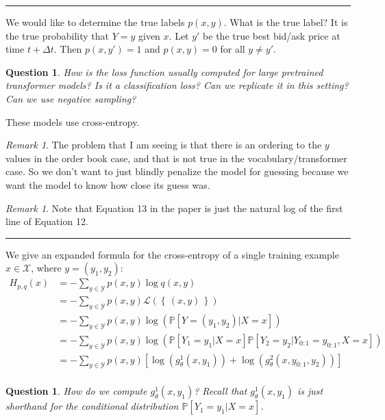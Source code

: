 \documentclass[12pt, reqno]{amsart}
\theoremstyle{definition}
\theoremstyle{definition}
\theoremstyle{plain}
\newtheorem{Ques}[theorem]{Question}
\theoremstyle{definition}
\theoremstyle{remark}
\newtheorem{rem}[theorem]{Remark}
\newcommand{\bee}{\begin{equation}\begin{aligned}}
\newcommand{\eee}{\end{aligned}\end{equation}}
\newcommand{\lpar}{\left(}				%
\newcommand{\rpar}{\right)}
\newcommand{\lbrac}{\left[}				%
\newcommand{\rbrac}{\right]}
\renewcommand{\'}{\hspace{0.5mm}'}			%
\renewcommand{\Set}[1]{\left\{\,#1\,\right\}}	%
\newcommand{\hrul}{\vspace{3mm}\hrule\vspace{3mm}}
\begin{document}
\hrul 

We would like to determine the true labels $p(x,y)$. What is the true label? It is the true probability that $Y = y$ given $x$. Let $y'$ be the true best bid/ask price at time $t + \Delta t$. Then $p(x,y') = 1$ and $p(x,y) = 0$ for all $y \neq y'$. 

\begin{Ques}
	How is the loss function usually computed for large pretrained transformer models? Is it a classification loss? Can we replicate it in this setting? Can we use negative sampling?
\end{Ques}

These models use cross-entropy. 

\begin{rem}
	The problem that I am seeing is that there is an ordering to the $y$ values in the order book case, and that is not true in the vocabulary/transformer case. So we don't want to just blindly penalize the model for guessing because we want the model to know how close its guess was. 
\end{rem}

\begin{rem}
	Note that Equation 13 in the paper is just the natural log of the first line of Equation 12. 
\end{rem}

\hrul 

We give an expanded formula for the cross-entropy of a single training example $x \in \mathcal{X}$, where $y = (y_1, y_2)$:
\bee
	H_{p,q}(x) 
	&= 
		- \sum_{y \in \mathcal{Y}}
		p(x,y)\log q(x,y) 
		\\ 
	&=
		- \sum_{y \in \mathcal{Y}}
		p(x,y)
		\mathcal{L}(\Set{(x,y)}) 
		\\
	&=
		- \sum_{y \in \mathcal{Y}}
		p(x,y)
		\log \lpar 
			\mathbb{P}[Y = (y_1, y_2)|X = x]
		\rpar 
		\\
	&=
		- \sum_{y \in \mathcal{Y}}
		p(x,y)
		\log \lpar 
			\mathbb{P}[Y_1 = y_1|X = x]
			\mathbb{P}[
				Y_2 = y_2
				|Y_{0:1} = y_{0:1}, X = x
			]
		\rpar 
		\\
	&=
		- \sum_{y \in \mathcal{Y}}
		p(x,y)
		\lbrac 
			\log \lpar 
				g_\theta^1(x,y_1)
			\rpar 
			+
			\log \lpar 
				g_\theta^2(x,y_{0:1}, y_2)
			\rpar 
		\rbrac 	
		\\	
\eee

\begin{Ques}
	How do we compute $g_\theta^1(x,y_1)$? Recall that $g_\theta^1(x,y_1)$ is just shorthand for the conditional distribution $\mathbb{P}[Y_1 = y_1|X = x]$. 
\end{Ques}
\end{document}
